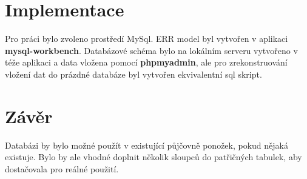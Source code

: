 \documentclass[titlepage]{article}
\begin{document}
\section{Implementace}
Pro práci bylo zvoleno prostředí MySql. ERR model byl vytvořen v aplikaci {\bf
mysql-workbench}. Databázové schéma bylo na lokálním serveru vytvořeno v téže
aplikaci a data vložena pomocí {\bf phpmyadmin}, ale pro zrekonstruování
vložení dat do prázdné databáze byl vytvořen ekvivalentní sql skript.

\section{Závěr}
Databázi by bylo možné použít v existující půjčovně ponožek, pokud nějaká
existuje. Bylo by ale vhodné doplnit několik sloupců do patřičných tabulek, aby
dostačovala pro reálné použití.
\end{document}
